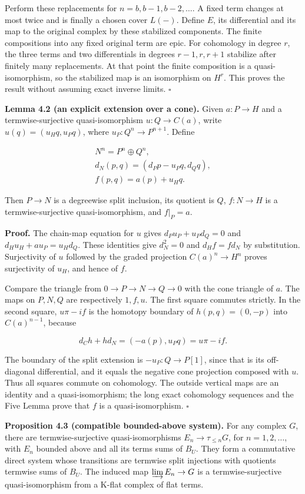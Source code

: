 \documentclass[
  english,
  11pt,
  a4paper,
]{article}
\begin{document}
Perform these replacements for \(n=b,b-1,b-2,\ldots\). A fixed term
changes at most twice and is finally a chosen cover \(L(-)\). Define
\(E\), its differential and its map to the original complex by these
stabilized components. The finite compositions into any fixed original
term are epic. For cohomology in degree \(r\), the three terms and two
differentials in degrees \(r-1,r,r+1\) stabilize after finitely many
replacements. At that point the finite composition is a
quasi-isomorphism, so the stabilized map is an isomorphism on \(H^r\).
This proves the result without assuming exact inverse limits.
\(\square\)

\textbf{Lemma 4.2 (an explicit extension over a cone).} Given
\(a:P\to H\) and a termwise-surjective quasi-isomorphism
\(u:Q\to C(a)\), write \(u(q)=(u_Hq,u_Pq)\), where
\(u_P:Q^n\to P^{n+1}\). Define

\[\begin{gathered}
N^n=P^n\oplus Q^n,\\
d_N(p,q)=(d_Pp-u_Pq,d_Qq),\\
f(p,q)=a(p)+u_Hq.
\end{gathered}
\tag{4.1}\]

Then \(P\to N\) is a degreewise split inclusion, its quotient is \(Q\),
\(f:N\to H\) is a termwise-surjective quasi-isomorphism, and \(f|_P=a\).

\textbf{Proof.} The chain-map equation for \(u\) gives
\(d_Pu_P+u_Pd_Q=0\) and \(d_Hu_H+a u_P=u_Hd_Q\). These identities give
\(d_N^2=0\) and \(d_Hf=f d_N\) by substitution. Surjectivity of \(u\)
followed by the graded projection \(C(a)^n\to H^n\) proves surjectivity
of \(u_H\), and hence of \(f\).

Compare the triangle from \(0\to P\to N\to Q\to0\) with the cone
triangle of \(a\). The maps on \(P,N,Q\) are respectively \(1,f,u\). The
first square commutes strictly. In the second square, \(u\pi-i f\) is
the homotopy boundary of \(h(p,q)=(0,-p)\) into \(C(a)^{n-1}\), because

\[d_Ch+h d_N=(-a(p),u_Pq)=u\pi-i f.\]

The boundary of the split extension is \(-u_P:Q\to P[1]\), since that is
its off-diagonal differential, and it equals the negative cone
projection composed with \(u\). Thus all squares commute on cohomology.
The outside vertical maps are an identity and a quasi-isomorphism; the
long exact cohomology sequences and the Five Lemma prove that \(f\) is a
quasi-isomorphism. \(\square\)

\textbf{Proposition 4.3 (compatible bounded-above system).} For any
complex \(G\), there are termwise-surjective quasi-isomorphisms
\(E_n\to\tau_{\le n}G\), for \(n=1,2,\ldots\), with \(E_n\) bounded
above and all its terms sums of \(B_U\). They form a commutative direct
system whose transitions are termwise split injections with quotients
termwise sums of \(B_U\). The induced map \(\varinjlim E_n\to G\) is a
termwise-surjective quasi-isomorphism from a K-flat complex of flat
terms.
\end{document}
